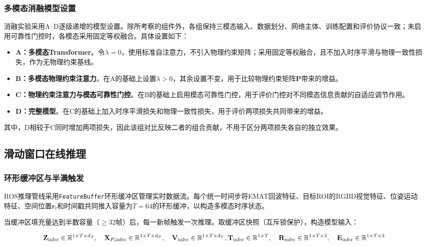 \subsubsection{多模态消融模型设置}

消融实验采用A--D逐级递增的模型设置。除所考察的组件外，各组保持三模态输入、数据划分、网络主体、训练配置和评价协议一致；未启用可靠性门控时，各模态采用固定等权融合。具体设置如下：

\begin{itemize}
\item \textbf{A：多模态Transformer}。令$\lambda=0$，使用标准自注意力，不引入物理约束矩阵；采用固定等权融合，且不加入时序平滑与物理一致性损失，作为无物理约束基线。
\item \textbf{B：多模态物理约束注意力}。在A的基础上设置$\lambda>0$，其余设置不变，用于比较物理约束矩阵$\mathbf{P}$带来的增益。
\item \textbf{C：物理约束注意力与模态可靠性门控}。在B的基础上启用模态可靠性门控，用于评价门控对不同模态信息贡献的自适应调节作用。
\item \textbf{D：完整模型}。在C的基础上加入时序平滑损失和物理一致性损失，用于评价两项损失共同带来的增益。
\end{itemize}

其中，D相较于C同时增加两项损失，因此该组对比反映二者的组合贡献，不用于区分两项损失各自的独立效果。

\subsection{滑动窗口在线推理}

\subsubsection{环形缓冲区与半满触发}

ROS推理管线采用\texttt{FeatureBuffer}环形缓冲区管理实时数据流。每个统一时间步将EMAT回波特征、目标ROI的RGBD视觉特征、位姿运动特征、空间位置$\mathbf{r}_t$和时间戳共同推入容量为$T = 64$的环形缓冲，以构造多模态时序状态。

当缓冲区填充量达到半数容量（$\geq 32$帧）后，每一新帧触发一次推理。取缓冲区快照（互斥锁保护），构造模型输入：

\begin{equation}
\mathbf{Z}_{\text{infer}} \in \mathbb{R}^{1 \times T \times d_Z}, \quad
\mathbf{X}_{P,\text{infer}} \in \mathbb{R}^{1 \times T \times d_P}, \quad
\mathbf{V}_{\text{infer}} \in \mathbb{R}^{1 \times T \times d_V}, \\
\mathbf{T}_{\text{infer}} \in \mathbb{R}^{1 \times T}, \quad
\mathbf{R}_{\text{infer}} \in \mathbb{R}^{1 \times T \times 3}, \quad
\mathbf{E}_{\text{infer}} \in \mathbb{R}^{1 \times T \times 3}
\label{eq:inference_input}
\end{equation}

